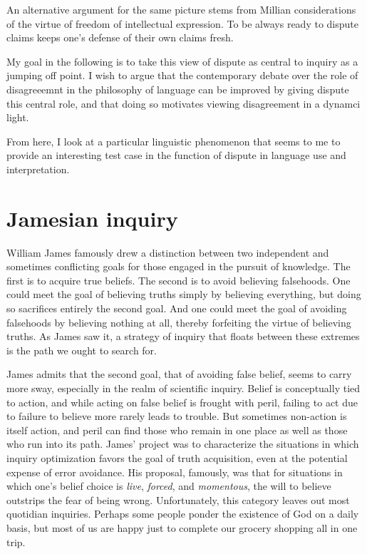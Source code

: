 \documentclass[letterpaper,10pt]{article}
\begin{document}
An alternative argument for the same picture stems from Millian considerations of the virtue of freedom of intellectual expression.  To be always ready to dispute claims keeps one's defense of their own claims fresh.

My goal in the following is to take this view of dispute as central to inquiry as a jumping off point.  I wish to argue that the contemporary debate over the role of disagreeemnt in the philosophy of language can be improved by giving dispute this central role, and that doing so motivates viewing disagreement in a dynamci light.  

From here, I look at a particular linguistic phenomenon that seems to me to provide an interesting test case in the function of dispute in language use and interpretation.  

\section{Jamesian inquiry}

William James famously drew a distinction between two independent and sometimes conflicting goals for those engaged in the pursuit of knowledge.  The first is to acquire true beliefs.  The second is to avoid believing falsehoods.  One could meet the goal of believing truths simply by believing everything, but doing so sacrifices entirely the second goal.  And one could meet the goal of avoiding falsehoods by believing nothing at all, thereby forfeiting the virtue of believing truths. As James saw it, a strategy of inquiry that floats between these extremes is the path we ought to search for.

James admits that the second goal, that of avoiding false belief, seems to carry more sway, especially in the realm of scientific inquiry.  Belief is conceptually tied to action, and while acting on false belief is frought with peril, failing to act due to failure to believe more rarely leads to trouble.  But sometimes non-action is itself action, and peril can find those who remain in one place as well as those who run into its path.  James' project was to characterize the situations in which inquiry optimization favors the goal of truth acquisition, even at the potential expense of error avoidance.  His proposal, famously, was that for situations in which one's belief choice is \textit{live}, \textit{forced}, and \textit{momentous}, the will to believe outstrips the fear of being wrong. Unfortunately, this category leaves out most quotidian inquiries.  Perhaps some people ponder the existence of God on a daily basis, but most of us are happy just to complete our grocery shopping all in one trip.
\end{document}
